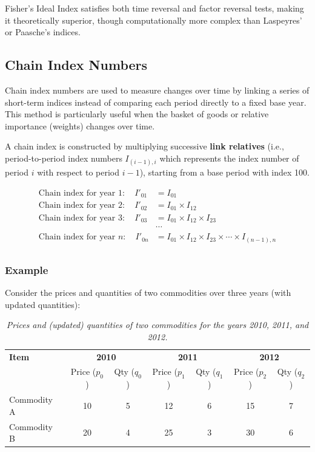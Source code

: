 \documentclass[twoside]{book}
\begin{document}
Fisher's Ideal Index satisfies both time reversal and factor reversal tests, making it theoretically superior, though computationally more complex than Laspeyres' or Paasche's indices.


\subsection{Chain Index Numbers}

Chain index numbers are used to measure changes over time by linking a series of short-term indices instead of comparing each period directly to a fixed base year. This method is particularly useful when the basket of goods or relative importance (weights) changes over time.

A chain index is constructed by multiplying successive \textbf{link relatives} (i.e., period-to-period index numbers \( I_{(i-1),i} \) which represents the index number of period \(i\) with respect to period \(i-1\)), starting from a base period with index 100.
\begin{textbox}
\begin{align*}
\text{Chain index for year } 1: \quad I'_{01} &= I_{01} \\
\text{Chain index for year } 2: \quad I'_{02} &= I_{01} \times I_{12}\\
\text{Chain index for year } 3: \quad I'_{03} &= I_{01} \times I_{12} \times I_{23}\\
&\cdots \\
\text{Chain index for year } n: \quad I'_{0n} &= I_{01} \times I_{12} \times I_{23} \times \cdots \times I_{(n-1),n}\\
\end{align*}
\end{textbox}


\subsubsection{Example}

Consider the prices and quantities of two commodities over three years (with updated quantities):

\begin{table}[H]
\centering
\begin{tabular}{p{2.5cm}|cc|cc|cc}
\toprule
\textbf{Item}
  & \multicolumn{2}{c|}{\textbf{2010}}
  & \multicolumn{2}{c|}{\textbf{2011}}
  & \multicolumn{2}{c}{\textbf{2012}} \\

  & Price ($p_0$) & Qty ($q_0$)
  & Price ($p_1$) & Qty ($q_1$)
  & Price ($p_2$) & Qty ($q_2$)  \\
\midrule
Commodity A & 10 & 5 & 12 & 6 & 15 & 7 \\
Commodity B & 20 & 4 & 25 & 3 & 30 & 6 \\
\bottomrule
\end{tabular}
\caption{\textit{Prices and (updated) quantities of two commodities for the years 2010, 2011, and 2012.}}
\label{tab:prices_quantities_updated}
\end{table}
\end{document}
